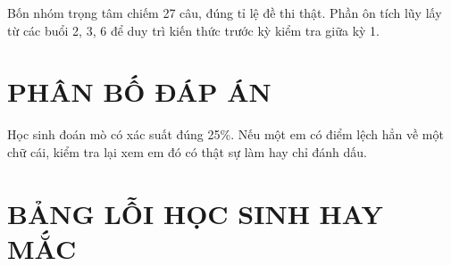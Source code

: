 \documentclass[11pt, a4paper]{article}
\begin{document}
Bốn nhóm trọng tâm chiếm 27 câu, đúng tỉ lệ đề thi thật. Phần ôn tích lũy lấy từ các buổi 2, 3, 6 để duy trì kiến thức trước kỳ kiểm tra giữa kỳ 1.

\section{PHÂN BỐ ĐÁP ÁN}


Học sinh đoán mò có xác suất đúng 25\%. Nếu một em có điểm lệch hẳn về một chữ cái, kiểm tra lại xem em đó có thật sự làm hay chỉ đánh dấu.

\section{BẢNG LỖI HỌC SINH HAY MẮC}
\end{document}
